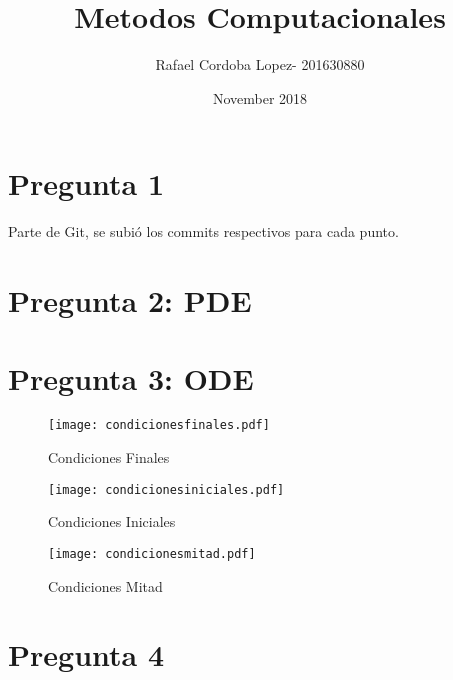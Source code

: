 \documentclass{article}
\title{Metodos Computacionales}
\author{Rafael Cordoba Lopez- 201630880 }
\date{November 2018}
\begin{document}
\maketitle

\section{Pregunta 1}
Parte de Git, se subió los commits respectivos para cada punto.
\section{Pregunta 2: PDE}

\section{Pregunta 3: ODE}
\begin{figure}
  \centering
    \texttt{[image: condicionesfinales.pdf]}
  \caption{Condiciones Finales}
  \label{fig:ejemplo1}
\end{figure}
\begin{figure}
  \centering
    \texttt{[image: condicionesiniciales.pdf]}
  \caption{Condiciones Iniciales}
  \label{fig:ejemplo2}
\end{figure}

\begin{figure}
  \centering
    \texttt{[image: condicionesmitad.pdf]}
  \caption{Condiciones Mitad}
  \label{fig:ejemplo3}
\end{figure}

\section{Pregunta 4}
\end{document}
